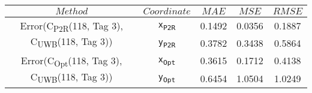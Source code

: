 \begin{table}[h]
\centering
\begin{tabular}{|c|c|c|c|c|}
\hline
$Method$ & $Coordinate$ & $MAE$ & $MSE$ & $RMSE$ \\
\hline
\multirow{2}{*}{{\footnotesize Error(C\textsubscript{P2R}(118, Tag 3), C\textsubscript{UWB}(118, Tag 3))}} & \texttt{x\textsubscript{P2R}} & 0.1492 & 0.0356 & 0.1887 \\
& \texttt{y\textsubscript{P2R}} & 0.3782 & 0.3438 & 0.5864 \\
\hline
\multirow{2}{*}{{\footnotesize Error(C\textsubscript{Opt}(118, Tag 3), C\textsubscript{UWB}(118, Tag 3))}} & \texttt{x\textsubscript{Opt}} & 0.3615 & 0.1712 & 0.4138 \\
& \texttt{y\textsubscript{Opt}} & 0.6454 & 1.0504 & 1.0249 \\
\hline
\end{tabular}
\end{table}
